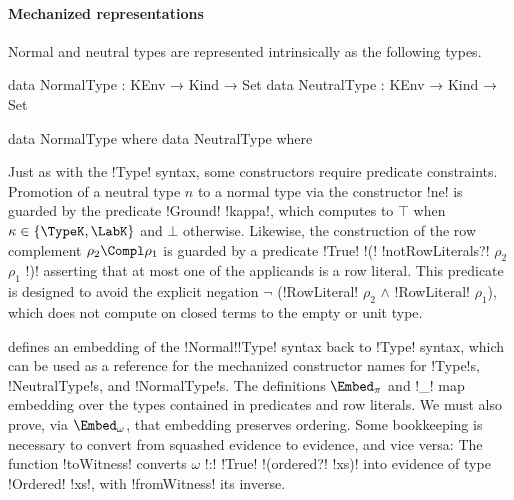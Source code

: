\paragraph{Mechanized representations} Normal and neutral types are represented intrinsically as the following types.

\begin{AgdaAlign}
\begin{code}
  data NormalType  : KEnv → Kind → Set
  data NeutralType : KEnv → Kind → Set
\end{code}
\begin{code}[hide]
  data NormalType where
  data NeutralType where
\end{code}
\end{AgdaAlign}

Just as with the !Type! syntax, some constructors require predicate constraints. Promotion of a neutral type $n$ to a normal type via the constructor !ne! is guarded by the predicate !Ground! !kappa!, which computes to $\top$ when $\kappa \in \{ \TypeK , \LabK \}$ and $\bot$ otherwise. Likewise, the construction of the row complement $\rho_{2} \Compl \rho_{1}$ is guarded by a predicate !True! !(! !notRowLiterals?! $\rho_{2}$ $\rho_{1}$ !)! asserting that at most one of the applicands is a row literal. This predicate is designed to avoid the explicit negation $\neg$ (!RowLiteral! $\rho_{2}$ $\wedge$ !RowLiteral! $\rho_{1}$), which does not compute on closed terms to the empty or unit type.

 defines an embedding of the !Normal!\-!Type! syntax back to !Type! syntax, which can be used as a reference for the mechanized constructor names for !Type!s, !NeutralType!s, and !NormalType!s. The definitions $\Embed_{\pi}$ and !\Embed_{\rho}! map embedding over the types contained in predicates and row literals. We must also prove, via $\Embed_{\omega}$, that embedding preserves ordering. Some bookkeeping is necessary to convert from squashed evidence to evidence, and vice versa: The function !toWitness! converts $\omega$ !:! !True! !(ordered?! !xs)! into evidence of type !Ordered! !xs!, with !fromWitness! its inverse.


